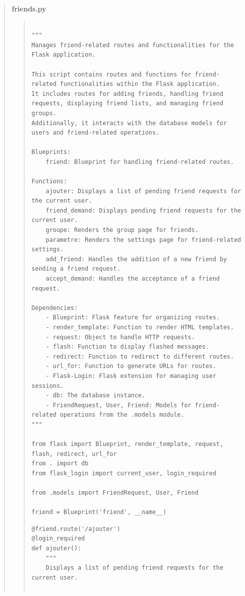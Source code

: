 \documentclass{article}
\begin{document}
\begin{quote}
    \textbf{friends.py}
    \begin{quote}
        
        \begin{tcolorbox}[colback=grisClair,colframe=black]
            \begin{lstlisting}

"""
Manages friend-related routes and functionalities for the Flask application.

This script contains routes and functions for friend-related functionalities within the Flask application.
It includes routes for adding friends, handling friend requests, displaying friend lists, and managing friend groups.
Additionally, it interacts with the database models for users and friend-related operations.

Blueprints:
    friend: Blueprint for handling friend-related routes.

Functions:
    ajouter: Displays a list of pending friend requests for the current user.
    friend_demand: Displays pending friend requests for the current user.
    groupe: Renders the group page for friends.
    parametre: Renders the settings page for friend-related settings.
    add_friend: Handles the addition of a new friend by sending a friend request.
    accept_demand: Handles the acceptance of a friend request.

Dependencies:
    - Blueprint: Flask feature for organizing routes.
    - render_template: Function to render HTML templates.
    - request: Object to handle HTTP requests.
    - flash: Function to display flashed messages.
    - redirect: Function to redirect to different routes.
    - url_for: Function to generate URLs for routes.
    - Flask-Login: Flask extension for managing user sessions.
    - db: The database instance.
    - FriendRequest, User, Friend: Models for friend-related operations from the .models module.
"""

from flask import Blueprint, render_template, request, flash, redirect, url_for
from . import db
from flask_login import current_user, login_required

from .models import FriendRequest, User, Friend

friend = Blueprint('friend', __name__)
                \end{lstlisting}       
            \end{tcolorbox}

            \begin{tcolorbox}[colback=grisClair,colframe=black]
                \begin{lstlisting}
@friend.route('/ajouter')
@login_required
def ajouter():
    """
    Displays a list of pending friend requests for the current user.


\end{lstlisting}
\end{tcolorbox}
\end{quote}
\end{quote}
\end{document}
